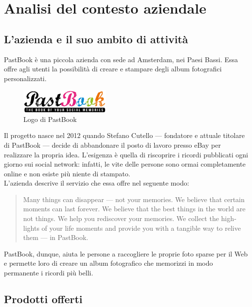 \chapter{Analisi del contesto aziendale}
	\section{L'azienda e il suo ambito di attività}
		PastBook è una piccola azienda con sede ad Amsterdam, nei Paesi Bassi. Essa offre agli utenti la possibilità di creare e stampare
		degli album fotografici personalizzati.
		\begin{figure}[H]
			\centering
			\includegraphics[width=0.4\textwidth]{capitolo_1/immagini/logo_pastbook.png}
			\caption[Logo di PastBook]{Logo di PastBook\protect\footnotemark}
		\end{figure}
		Il progetto nasce nel 2012 quando Stefano Cutello — fondatore e attuale titolare di PastBook — decide di abbandonare il posto di
		lavoro presso eBay per realizzare la propria idea. L'esigenza è quella di riscoprire i ricordi pubblicati ogni giorno sui social
		network: infatti, le vite delle persone sono ormai completamente online e non esiste più niente di stampato.\\
		L'azienda descrive il servizio che essa offre nel seguente modo:
		\hyphenblockquote{english}{Many things can disappear — not your memories. We believe that certain moments can last forever. We
			believe that the best things in the world are not things. We help you rediscover your memories. We collect the highlights of
			your life moments and provide you with a tangible way to relive them — in PastBook.}
		PastBook, dunque, aiuta le persone a raccogliere le proprie foto sparse per il Web e permette loro di creare un album fotografico
		che memorizzi in modo permanente i ricordi più belli.
	\section{Prodotti offerti}
